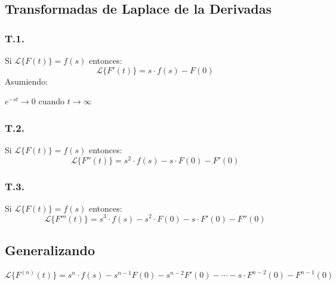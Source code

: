 \subsection*{Transformadas de Laplace de la Derivadas}
\subsubsection*{T.1.}
Si $\mathscr{L} \lbrace F(t) \rbrace = f(s)$ entonces:
$$\mathscr{L} \lbrace F'(t) \rbrace = s\cdot f(s) - F(0)$$
Asumiendo:
\begin{center}
$e^{-st} \to 0$ cuando $t\to\infty$
\end{center}
\subsubsection*{T.2.}
Si $\mathscr{L} \lbrace F(t) \rbrace = f(s)$ entonces:
$$\mathscr{L} \lbrace F''(t) \rbrace = s^2\cdot f(s) - s\cdot F(0)-F'(0)$$
\subsubsection*{T.3.}
Si $\mathscr{L} \lbrace F(t) \rbrace = f(s)$ entonces:
$$\mathscr{L} \lbrace F'''(t) \rbrace = s^3\cdot f(s) - s^2 \cdot F(0)-s\cdot F'(0)-F''(0)$$
\subsection*{Generalizando}
$$\mathscr{L} \lbrace F^{(n)}(t) \rbrace = s^n\cdot f(s)-s^{n-1}F(0)-s^{n-2}F'(0)-\cdots -s\cdot F^{n-2}(0)-F^{n-1}(0)$$